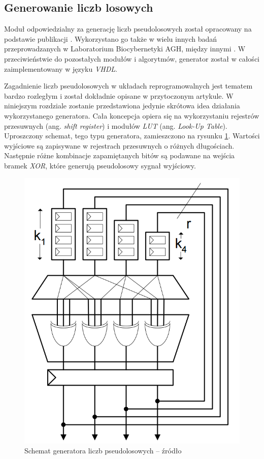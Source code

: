\subsection{Generowanie liczb losowych}
\label{subsec:fpga_generator}

Moduł odpowiedzialny za generację liczb pseudolosowych został opracowany na podstawie publikacji \cite{thomas_10}. Wykorzystano go także w wielu innych badań przeprowadzanych w Laboratorium Biocybernetyki AGH, między innymi \cite{kryjak_14_vibe, kryjak_14_pbas}. W przeciwieństwie do pozostałych modułów i algorytmów, generator został w całości zaimplementowany w języku \textit{VHDL}.

Zagadnienie liczb pseudolosowych w układach reprogramowalnych jest tematem bardzo rozległym i został dokładnie opisane w przytoczonym artykule. W niniejszym rozdziale zostanie przedstawiona jedynie skrótowa idea działania wykorzystanego generatora. Cała koncepcja opiera się na wykorzystaniu rejestrów przesuwnych (ang. \textit{shift register}) i modułów \textit{LUT} (ang. \textit{Look-Up Table}). Uproszczony schemat, tego typu generatora, zamieszczono na rysunku \ref{fig:fpga_rng}. Wartości wyjściowe są zapisywane w rejestrach przesuwnych o różnych długościach. Następnie różne kombinacje zapamiętanych bitów są podawane na wejścia bramek \textit{XOR}, które generują pseudolosowy sygnał wyjściowy.

	\begin{figure}[h!]
        \centering
		\includegraphics[scale=0.3]{img/4/rng_scheme.png}
		\caption{Schemat generatora liczb pseudolosowych -- źródło \cite{thomas_10}}
		\label{fig:fpga_rng}
	\end{figure}

